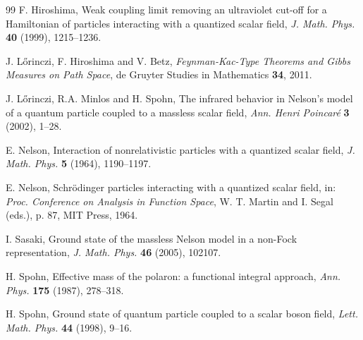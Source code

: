 \documentclass[11pt]{article}
\providecommand{\1}{\mathbb{1}}
\begin{document}
{\begin{thebibliography}{99}
F. Hiroshima,
Weak coupling limit removing an ultraviolet cut-off for a Hamiltonian of
particles interacting with a quantized scalar field, {\it  J. Math. Phys.} {\bf  40}
(1999), 1215--1236.

J. L\H orinczi,  F. Hiroshima and V. Betz,
{\it Feynman-Kac-Type Theorems and Gibbs Measures on Path Space}, de Gruyter Studies
in Mathematics {\bf 34},  2011.

J. L\H{o}rinczi, R.A. Minlos and H. Spohn,
The infrared behavior in Nelson's model of a quantum particle coupled to a massless scalar
field, {\it Ann. Henri Poincar\'e}  {\bf 3} (2002), 1--28.

E. Nelson,
Interaction of nonrelativistic particles with a quantized scalar field,
{\it J.   Math.   Phys. } {\bf  5}  (1964),   1190--1197.


E. Nelson,
Schr\"odinger particles interacting with a quantized scalar field, in: {\it Proc. Conference
on Analysis in Function Space}, W. T.  Martin and I. Segal (eds.), p. 87, MIT Press, 1964.

I. Sasaki,
Ground state of the massless Nelson model in a non-Fock representation,
{\it J. Math. Phys.} {\bf 46} (2005), 102107.

H. Spohn,
Effective mass of the polaron: a functional integral approach, {\it Ann. Phys.} {\bf 175}
(1987), 278--318.

H.  Spohn,
Ground state of quantum particle coupled to a scalar boson field,
{\it  Lett.   Math.   Phys.  } {\bf 44}   (1998),   9--16.

\end{thebibliography}
}
\end{document}
